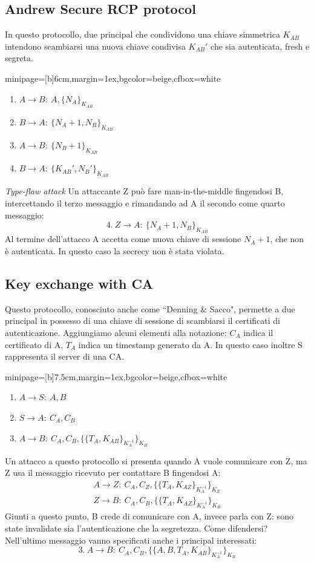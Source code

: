 \documentclass[a4paper, 11pt, notitlepage, fleqn]{report}
\newcommand{\fromto}[2]{#1\rightarrow #2\!:\ }
\newenvironment{colbox}[2]%
{%
	\par\noindent\hspace{10pt}
	\begin{adjustbox}{minipage=[b]{#2},margin=1ex,bgcolor=#1,cfbox=white}
}{%
	\end{adjustbox}\newline%
}
\begin{document}
\subsection{Andrew Secure RCP protocol}
In questo protocollo, due principal che condividono una chiave simmetrica $K_{AB}$ intendono scambiarsi una nuova chiave condivisa $K_{AB}'$ che sia autenticata, fresh e segreta.
\begin{colbox}{beige}{6cm}
	\begin{enumerate}
		\item $\fromto{A}{B}A,\{N_A\}_{K_{AB}}$
		\item $\fromto{B}{A}\{N_A+1,N_B\}_{K_{AB}}$
		\item $\fromto{A}{B}\{N_B+1\}_{K_{AB}}$
		\item $\fromto{B}{A}\{K_{AB}',N_B'\}_{K_{AB}}$
	\end{enumerate}
\end{colbox}
\emph{Type-flaw attack}
Un attaccante Z può fare man-in-the-middle fingendosi B, intercettando il terzo messaggio e rimandando ad A il secondo come quarto messaggio:
\begin{equation*}
	4.\ \fromto{Z}{A}\{N_A+1,N_B\}_{K_{AB}}
\end{equation*}
Al termine dell'attacco A accetta come nuova chiave di sessione $N_A+1$, che non è autenticata. In questo caso la secrecy non è stata violata.

\subsection{Key exchange with CA}
Questo protocollo, conosciuto anche come ``Denning \& Sacco", permette a due principal in possesso di una chiave di sessione di scambiarsi il certificati di autenticazione. Aggiungiamo alcuni elementi alla notazione: $C_A$ indica il certificato di A, $T_A$ indica un timestamp generato da A. In questo caso inoltre S rappresenta il server di una CA.
\begin{colbox}{beige}{7.5cm}
	\begin{enumerate}
		\item $\fromto{A}{S}A,B$
		\item $\fromto{S}{A}C_A,C_B$
		\item $\fromto{A}{B}C_A,C_B,\{\{T_A,K_{AB}\}_{K_A^{-1}}\}_{K_B}$
	\end{enumerate}
\end{colbox}
Un attacco a questo protocollo si presenta quando A vuole comunicare con Z, ma Z usa il messaggio ricevuto per contattare B fingendosi A:
\begin{gather*}
	\fromto{A}{Z}C_A,C_Z,\{\{T_A,K_{AZ}\}_{K_A^{-1}}\}_{K_Z}\\
	\fromto{Z}{B}C_A,C_B,\{\{T_A,K_{AZ}\}_{K_A^{-1}}\}_{K_B}
\end{gather*}
Giunti a questo punto, B crede di comunicare con A, invece parla con Z: sono state invalidate sia l'autenticazione che la segretezza. Come difendersi?\\
Nell'ultimo messaggio vanno specificati anche i principal interessati:
\begin{equation*}
	3.\ \fromto{A}{B}C_A,C_B,\{\{A,B,T_A,K_{AB}\}_{K_A^{-1}}\}_{K_B}
\end{equation*}
\end{document}
